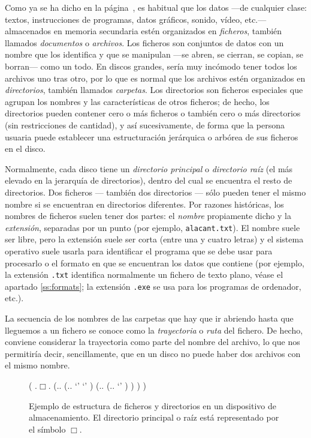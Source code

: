 Como ya se ha dicho en la página~\pageref{pg:menciofitxer}, es habitual que los datos ---de cualquier clase: textos, instrucciones de programas, datos gráficos, sonido, vídeo, etc.--- almacenados en memoria secundaria estén organizados en {\em ficheros}, también llamados \emph{documentos} o \emph{archivos}. Los ficheros son conjuntos de datos con un nombre que los identifica y que se manipulan ---se abren, se cierran, se copian, se borran--- como un todo. En discos grandes, sería muy incómodo tener todos los archivos uno tras otro, por lo que es normal que los archivos estén organizados en {\em directorios}, también llamados \emph{carpetas}. Los directorios son ficheros especiales que agrupan los nombres y las características de otros ficheros; de hecho, los directorios pueden contener cero o más ficheros o también cero o más directorios (sin restricciones de cantidad), y así sucesivamente, de forma que la persona usuaria puede establecer una estructuración jerárquica o arbórea de sus ficheros en el disco. 

Normalmente, cada disco tiene un {\em directorio principal} o \emph{ directorio raíz} (el más elevado en la jerarquía de directorios), dentro del cual se encuentra el resto de directorios. Dos ficheros --- también dos directorios --- sólo pueden tener el mismo nombre si se encuentran en directorios diferentes. Por razones históricas, los nombres de ficheros suelen tener dos partes: el \emph{nombre} propiamente dicho y la \emph{extensión}, separadas por un punto (por ejemplo, \texttt{alacant.txt}). El nombre suele ser libre, pero la extensión suele ser corta (entre una y cuatro letras) y el sistema operativo suele usarla para identificar el programa que se debe usar para procesarlo o el formato en que se encuentran los datos que contiene (por ejemplo, la extensión \texttt{.txt} identifica normalmente un fichero de texto plano, véase el apartado \ref{ss:formats}; la extensión \texttt{.exe} se usa para los programas de ordenador, etc.). 

La secuencia de los nombres de las carpetas que hay que ir abriendo hasta que lleguemos a un fichero se conoce como la \emph{trayectoria} o \emph{ruta} del fichero. De hecho, conviene considerar la trayectoria como parte del nombre del archivo, lo que nos permitiría decir, sencillamente, que en un disco no puede haber dos archivos con el mismo nombre. 

\begin{figure} \centering

\begin{parsetree} ( .{$\Box$}. (.{}. (.{}. `' `' ) (.{}. (.{}. `' ) ) ) ) \end{parsetree} \caption{Ejemplo de estructura de ficheros y directorios en un dispositivo de almacenamiento. El directorio principal o raíz está representado por el símbolo $\Box$.}\label{fg:fitxersdirs} \end{figure} 


